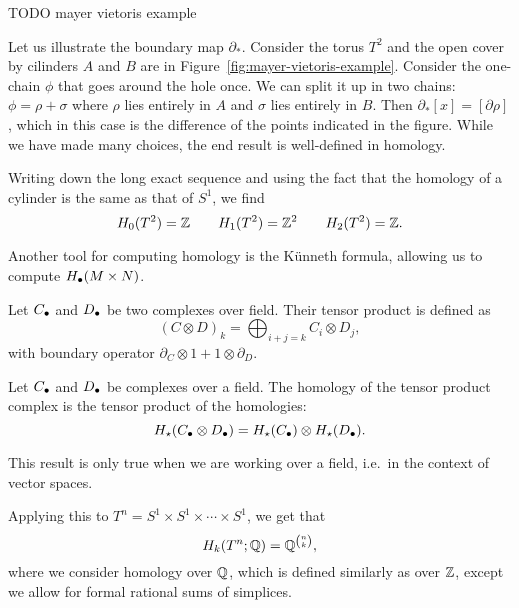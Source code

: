 \begin{eg}
    \begin{marginfigure}
        \centering
        \caption{TODO mayer vietoris example}
        \label{fig:mayer-vietoris-example}
    \end{marginfigure}

    Let us illustrate the boundary map $\partial_*$.
    Consider the torus $T^{2}$ and the open cover by cilinders $A$ and $B$ are in Figure~\ref{fig:mayer-vietoris-example}.
    Consider the one-chain $\phi$ that goes around the hole once. We can split it up in two chains: $\phi = \rho + \sigma$ where  $\rho$ lies entirely in  $A$ and $\sigma$ lies entirely in  $B$.
    Then  $\partial_* [x] = [\partial \rho]$, which in this case is the difference of the points indicated in the figure.
    While we have made many choices, the end result is well-defined in homology.

    Writing down the long exact sequence and using the fact that the homology of a cylinder is the same as that of $S^{1}$, we find
    \[
        H_0(T^2) = \mathbb{Z} \qquad 
        H_1(T^2) = \mathbb{Z}^2 \qquad 
        H_2(T^2) = \mathbb{Z}
    .\] 
\end{eg}

Another tool for computing homology is the Künneth formula, allowing us to compute $H_\bullet(M \times N)$.

\begin{definition}
    Let $C_\bullet$ and  $D_\bullet$ be two complexes over field. Their tensor product is defined as
     \[
         (C \otimes D)_k = \bigoplus_{i+j = k} C_i \otimes D_j
    ,\] 
    with boundary operator $\partial_C \otimes 1 + 1 \otimes\partial_D$.
\end{definition}
\begin{prop}
    Let $C_\bullet$ and  $D_\bullet$ be complexes over a field.
    The homology of the tensor product complex is the tensor product of the homologies:
    \[
        H_\star(C_\bullet \otimes D_\bullet) = H_\star(C_\bullet) \otimes H_\star(D_\bullet)
    .\] 
    \label{prop:hom-tensor-is-tensor-hom}
\end{prop}
\begin{remark}
    This result is only true when we are working over a field, i.e.\ in the context of vector spaces.
\end{remark}

\begin{eg}
    Applying this to $T^{n} = S^1 \times S^{1} \times \cdots\times S^{1}$, we get that
    \[
        H_k(T^n; \mathbb{Q}) = \mathbb{Q}^{\binom{n}{k}}
    ,\] 
    where we consider homology over $\mathbb{Q}$, which is defined similarly as over $\mathbb{Z}$, except we allow for formal rational sums of simplices.
\end{eg}

